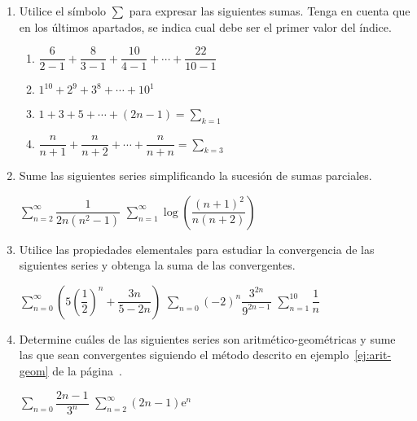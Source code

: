 \begin{enumerate}


\item
Utilice el símbolo $\sum$ para expresar las siguientes sumas.
Tenga en cuenta que en los últimos apartados, se indica cual debe ser el primer valor del índice.

\begin{enumerate}\renewcommand{\itemsep}{1em}

\item
$\dfrac6{2-1}+\dfrac8{3-1}+\dfrac{10}{4-1}+\cdots+\dfrac{22}{10-1}$

\item
$1^{10}+2^9+3^8+\cdots+ 10^1$ 

\item
$1+3+5+\cdots+(2n-1) = \displaystyle\sum_{k=1}$ 

\item
$\dfrac{n}{n+1}+\dfrac{n}{n+2}+\cdots+\dfrac{n}{n+n}=\displaystyle\sum_{k=3}$
\end{enumerate}

\item
Sume las siguientes series simplificando la sucesión de sumas parciales.
\setcontadoralph
\begin{centrar}
\nitem $\displaystyle\sum_{n=2}^\infty   \dfrac{1}{2n(n^2-1)}$ \hfill
\nitem $\displaystyle\sum_{n=1}^\infty   \log\left(\dfrac{(n+1)^2}{n(n+2)}\right)$
\end{centrar}


\item
Utilice las propiedades elementales para estudiar la convergencia de las siguientes series y obtenga la suma de las convergentes.
\setcontadoralph
\begin{centrar}
\nitem $\displaystyle\sum_{n=0}^\infty \left(5\left(\dfrac12\right)^n+\dfrac{3n}{5-2n}\right)$\hfill
\nitem $\displaystyle\sum_{n=0} (-2)^n\dfrac{3^{2n}}{9^{2n-1}}$ \hfill
\nitem $\displaystyle\sum_{n=1}^{10}\dfrac{1}{n} $
\end{centrar}

\item
Determine cuáles de las siguientes series son aritmético-geométricas y sume las que sean convergentes siguiendo el método descrito en ejemplo~\ref{ej:arit-geom} de la página~\pageref{ej:arit-geom}.
\setcontadoralph
\begin{centrar}
\nitem $\displaystyle\sum_{n=0}\dfrac{2n-1}{3^n}$ \hfill
\nitem $\displaystyle\sum_{n=2}^\infty   (2n-1)\mbox{e}^n$ 
\end{centrar}


\end{enumerate}
